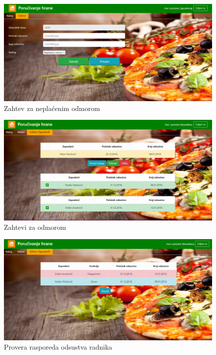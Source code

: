  \begin{figure}[!h]
    \includegraphics[width=1\textwidth]{slike/neplaceni_odmor.png}
    \caption{Zahtev za neplaćenim odmorom} %
    \label{fig:slika_neplaceni}
\end{figure} 




 \begin{figure}[!h]
    \includegraphics[width=1\textwidth]{slike/menadzer_zahteviZaOdmorom1.PNG}
    \caption{Zahtevi za  odmorom} %
    \label{fig:slika_odmor}
\end{figure}
\vspace{5cm}
\begin{figure}[!h]
    \includegraphics[width=1\textwidth]{slike/menadzer_proveraStanja.PNG}
    \caption{Provera rasporeda odsustva radnika} %
    \label{fig:slika_raspored}
\end{figure}
\newpage
